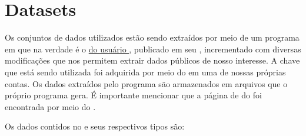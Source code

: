 \chapter{Datasets}

  Os conjuntos de dados utilizados estão sendo extraídos por meio de um programa em  que na verdade é o \href{https://github.com/mitchelljy/Trending-YouTube-Scraper}{ do usuário }, publicado em seu \href{https://github.com/mitchelljy}{}, incrementado com diversas modificações que nos permitem extrair dados públicos de nosso interesse. A chave \href{https://developers.google.com/youtube/v3/docs?hl=pt-br}{} que está sendo utilizada foi adquirida por meio do  em uma de nossas próprias contas. Os dados extraídos pelo programa são armazenados em arquivos  que o próprio programa gera. É importante mencionar que a página de  do  foi encontrada por meio do   \cite{kaggle}.

  Os dados contidos no  e seus respectivos tipos são:


